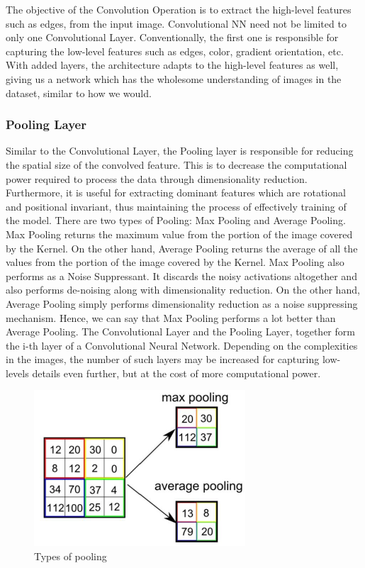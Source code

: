 \documentclass[12pt]{report}
\theoremstyle{plain}
\begin{document}
\begin{flushleft}
The objective of the Convolution Operation is to extract the high-level features such as edges, from the input image. Convolutional NN need not be limited to only one Convolutional Layer. Conventionally, the first one is responsible for capturing the low-level features such as edges, color, gradient orientation, etc. With added layers, the architecture adapts to the high-level features as well, giving us a network which has the wholesome understanding of images in the dataset, similar to how we would.\\

\subsubsection{Pooling Layer}
Similar to the Convolutional Layer, the Pooling layer is responsible for reducing the spatial size of the convolved feature. This is to decrease the computational power required to process the data through dimensionality reduction. Furthermore, it is useful for extracting dominant features which are rotational and positional invariant, thus maintaining the process of effectively training of the model. There are two types of Pooling: Max Pooling and Average Pooling. Max Pooling returns the maximum value from the portion of the image covered by the Kernel. On the other hand, Average Pooling returns the average of all the values from the portion of the image covered by the Kernel. Max Pooling also performs as a Noise Suppressant. It discards the noisy activations altogether and also performs de-noising along with dimensionality reduction. On the other hand, Average Pooling simply performs dimensionality reduction as a noise suppressing mechanism. Hence, we can say that Max Pooling performs a lot better than Average Pooling. The Convolutional Layer and the Pooling Layer, together form the i-th layer of a Convolutional Neural Network. Depending on the complexities in the images, the number of such layers may be increased for capturing low-levels details even further, but at the cost of more computational power.
\begin{figure}[!h]
	\centering
	\includegraphics[scale=1]{images/convNN_image_pooling.pdf}
	\caption{Types of pooling}
	\label{fig:convNN_image_pooling}
\end{figure}


\end{flushleft}
\end{document}
